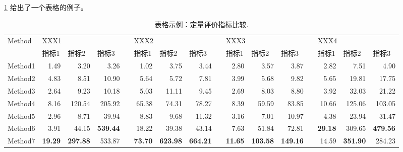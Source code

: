 \documentclass[a4paper,cs4size]{article}
\begin{document}
\cref{tab:Quantitative} 给出了一个表格的例子。

\begin{table}[htb!]
  \centering
  \setlength{\tabcolsep}{2pt}
  \scriptsize
  \caption{表格示例：定量评价指标比较.}
    \begin{tabular}{lrrrrrrrrrrrrrrr}
    \toprule
    Method & \multicolumn{3}{l}{XXX1} & & \multicolumn{3}{l}{XXX2} & & \multicolumn{3}{l}{XXX3} & & \multicolumn{3}{l}{XXX4} \\ 
    \cmidrule{2-4} \cmidrule{6-8} \cmidrule{10-12} \cmidrule{14-16}
           & \multicolumn{1}{l}{指标1} & \multicolumn{1}{l}{指标2} & \multicolumn{1}{l}{指标3} & & \multicolumn{1}{l}{指标1} & \multicolumn{1}{l}{指标2} & \multicolumn{1}{l}{指标3} & & \multicolumn{1}{l}{指标1} & \multicolumn{1}{l}{指标2} & \multicolumn{1}{l}{指标3} & & \multicolumn{1}{l}{指标1} & \multicolumn{1}{l}{指标2} & \multicolumn{1}{l}{指标3} \\
    \midrule          
    Method1 & 1.49  & 3.20  & 3.26  &       & 1.02  & 3.75  & 3.44  &       & 2.80  & 3.57  & 3.87  &       & 2.82  & 7.51  & 4.90 \\
    Method2 & 4.83  & 8.51  & 10.90 &       & 5.64  & 5.72  & 7.81  &       & 3.99  & 5.68  & 9.82  &       & 5.65  & 19.81 & 17.75 \\
    Method3 & 2.64  & 9.23  & 10.18 &       & 5.03  & 11.11 & 9.45  &       & 2.69  & 8.03  & 8.80  &       & 3.92  & 32.03 & 21.22 \\
    Method4   & 8.16  & 120.54 & 205.92 &       & 65.38 & 74.31 & 78.27 &       & 8.39  & 59.59 & 83.85 &       & 10.66 & 125.06 & 103.05 \\
    Method5 & 2.96  & 8.71  & 39.94 &       & 8.83  & 9.68  & 11.32 &       & 3.16  & 7.01  & 10.97 &       & 4.38  & 23.94 & 31.47 \\
    Method6  & 3.91  & 44.15 & \textbf{539.44} & \textbf{} & 18.22 & 39.38 & 43.14 &       & 7.63  & 51.84 & 72.81 &       & \textbf{29.18} & 309.65 & \textbf{479.56} \\
    Method7 & \textbf{19.29} & \textbf{297.88} & 533.87 &       & \textbf{73.70} & \textbf{623.98} & \textbf{664.21} & \textbf{} & \textbf{11.65} & \textbf{103.58} & \textbf{149.16} & \textbf{} & 14.59 & \textbf{351.90} & 284.23 \\
    \bottomrule
    \end{tabular}%
  \label{tab:Quantitative}%
\end{table}%
\end{document}
